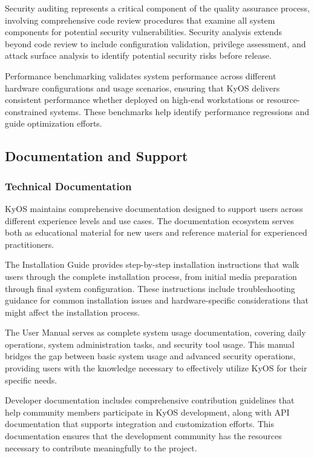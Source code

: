 \documentclass[12pt,a4paper]{article}
\begin{document}
Security auditing represents a critical component of the quality assurance process, involving comprehensive code review procedures that examine all system components for potential security vulnerabilities. Security analysis extends beyond code review to include configuration validation, privilege assessment, and attack surface analysis to identify potential security risks before release.

Performance benchmarking validates system performance across different hardware configurations and usage scenarios, ensuring that KyOS delivers consistent performance whether deployed on high-end workstations or resource-constrained systems. These benchmarks help identify performance regressions and guide optimization efforts.

\subsection{Documentation and Support}

\subsubsection{Technical Documentation}
KyOS maintains comprehensive documentation designed to support users across different experience levels and use cases. The documentation ecosystem serves both as educational material for new users and reference material for experienced practitioners.

The Installation Guide provides step-by-step installation instructions that walk users through the complete installation process, from initial media preparation through final system configuration. These instructions include troubleshooting guidance for common installation issues and hardware-specific considerations that might affect the installation process.

The User Manual serves as complete system usage documentation, covering daily operations, system administration tasks, and security tool usage. This manual bridges the gap between basic system usage and advanced security operations, providing users with the knowledge necessary to effectively utilize KyOS for their specific needs.

Developer documentation includes comprehensive contribution guidelines that help community members participate in KyOS development, along with API documentation that supports integration and customization efforts. This documentation ensures that the development community has the resources necessary to contribute meaningfully to the project.
\end{document}
